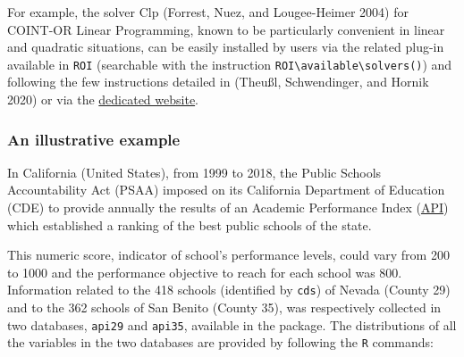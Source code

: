 For example, the solver Clp (Forrest, Nuez, and Lougee-Heimer 2004) for COINT-OR Linear Programming, known to be particularly convenient in linear and quadratic situations, can be easily installed by users via the related plug-in available in \texttt{ROI} (searchable with the instruction \texttt{ROI\textbackslash{}available\textbackslash{}solvers()}) and following the few instructions detailed in (Theußl, Schwendinger, and Hornik 2020) or via the \href{https://roi.r-forge.r-project.org/installation.html}{dedicated website}.

\hypertarget{an-illustrative-example}{%
\subsubsection{An illustrative example}\label{an-illustrative-example}}

In California (United States), from 1999 to 2018, the Public Schools Accountability Act (PSAA) imposed on its California Department of Education (CDE) to provide annually the results of an Academic Performance Index (\href{https://www.ed-data.org/article/Understanding-the-Academic-Performance-Index-(API)}{API}) which established a ranking of the best public schools of the state.

This numeric score, indicator of school's performance levels, could vary from 200 to 1000 and the performance objective to reach for each school was 800. Information related to the 418 schools (identified by \texttt{cds}) of Nevada (County 29) and to the 362 schools of San Benito (County 35), was respectively collected in two databases, \texttt{api29} and \texttt{api35}, available in the package. The distributions of all the variables in the two databases are provided by following the \texttt{R} commands:

